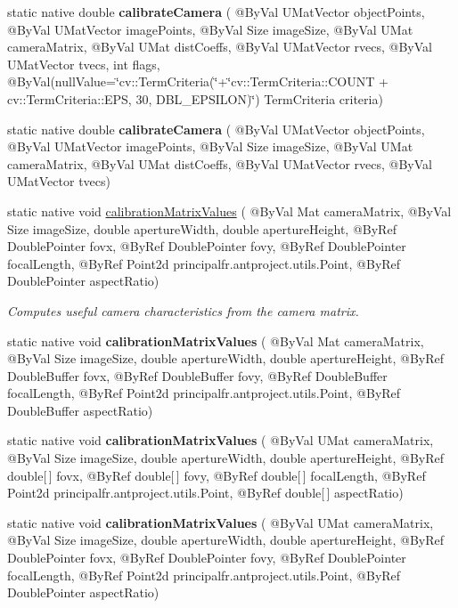 \begin{DoxyCompactItemize}
\item 
static native double {\bfseries calibrate\+Camera} ( @By\+Val U\+Mat\+Vector object\+Points, @By\+Val U\+Mat\+Vector image\+Points, @By\+Val Size image\+Size, @By\+Val U\+Mat camera\+Matrix, @By\+Val U\+Mat dist\+Coeffs, @By\+Val U\+Mat\+Vector rvecs, @By\+Val U\+Mat\+Vector tvecs, int flags, @By\+Val(null\+Value=\char`\"{}cv\+::\+Term\+Criteria(\char`\"{}+\char`\"{}cv\+::\+Term\+Criteria\+::\+C\+O\+U\+NT + cv\+::\+Term\+Criteria\+::\+E\+PS, 30, D\+B\+L\+\_\+\+E\+P\+S\+I\+L\+ON)\char`\"{}) Term\+Criteria criteria)
\item 
static native double {\bfseries calibrate\+Camera} ( @By\+Val U\+Mat\+Vector object\+Points, @By\+Val U\+Mat\+Vector image\+Points, @By\+Val Size image\+Size, @By\+Val U\+Mat camera\+Matrix, @By\+Val U\+Mat dist\+Coeffs, @By\+Val U\+Mat\+Vector rvecs, @By\+Val U\+Mat\+Vector tvecs)
\item 
static native void \hyperlink{group__calib3d_ga35bea5b10b8dfd23238f72e9a2e2ac27}{calibration\+Matrix\+Values} ( @By\+Val Mat camera\+Matrix, @By\+Val Size image\+Size, double aperture\+Width, double aperture\+Height, @By\+Ref Double\+Pointer fovx, @By\+Ref Double\+Pointer fovy, @By\+Ref Double\+Pointer focal\+Length, @By\+Ref Point2d principal\+fr.antproject.utils.Point, @By\+Ref Double\+Pointer aspect\+Ratio)
\begin{DoxyCompactList}\small\item\em Computes useful camera characteristics from the camera matrix. \end{DoxyCompactList}\item 
static native void {\bfseries calibration\+Matrix\+Values} ( @By\+Val Mat camera\+Matrix, @By\+Val Size image\+Size, double aperture\+Width, double aperture\+Height, @By\+Ref Double\+Buffer fovx, @By\+Ref Double\+Buffer fovy, @By\+Ref Double\+Buffer focal\+Length, @By\+Ref Point2d principal\+fr.antproject.utils.Point, @By\+Ref Double\+Buffer aspect\+Ratio)
\item 
static native void {\bfseries calibration\+Matrix\+Values} ( @By\+Val U\+Mat camera\+Matrix, @By\+Val Size image\+Size, double aperture\+Width, double aperture\+Height, @By\+Ref double\mbox{[}$\,$\mbox{]} fovx, @By\+Ref double\mbox{[}$\,$\mbox{]} fovy, @By\+Ref double\mbox{[}$\,$\mbox{]} focal\+Length, @By\+Ref Point2d principal\+fr.antproject.utils.Point, @By\+Ref double\mbox{[}$\,$\mbox{]} aspect\+Ratio)
\item 
static native void {\bfseries calibration\+Matrix\+Values} ( @By\+Val U\+Mat camera\+Matrix, @By\+Val Size image\+Size, double aperture\+Width, double aperture\+Height, @By\+Ref Double\+Pointer fovx, @By\+Ref Double\+Pointer fovy, @By\+Ref Double\+Pointer focal\+Length, @By\+Ref Point2d principal\+fr.antproject.utils.Point, @By\+Ref Double\+Pointer aspect\+Ratio)

\end{DoxyCompactItemize}
